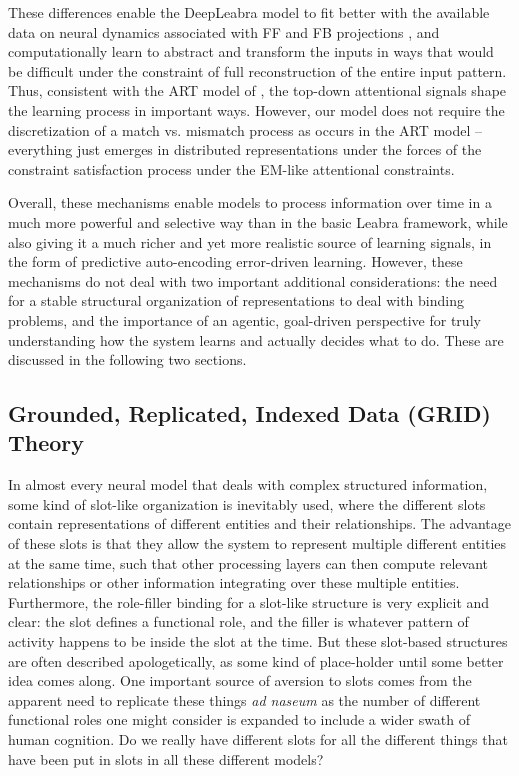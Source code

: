 \documentclass[11pt,twoside]{article}
\newif\myifpdf
\begin{document}
\begin{itemize}
These differences enable the DeepLeabra model to fit better with the available data on neural dynamics associated with FF and FB projections \cite{MarkovVezoliChameauEtAl14}, and computationally learn to abstract and transform the inputs in ways that would be difficult under the constraint of full reconstruction of the entire input pattern.  Thus, consistent with the ART model of , the top-down attentional signals shape the learning process in important ways.  However, our model does not require the discretization of a match vs. mismatch process as occurs in the ART model -- everything just emerges in distributed representations under the forces of the constraint satisfaction process under the EM-like attentional constraints.

\end{itemize}

Overall, these mechanisms enable models to process information over time in a much more powerful and selective way than in the basic Leabra framework, while also giving it a much richer and yet more realistic source of learning signals, in the form of predictive auto-encoding error-driven learning.  However, these mechanisms do not deal with two important additional considerations: the need for a stable structural organization of representations to deal with binding problems, and the importance of an agentic, goal-driven perspective for truly understanding how the system learns and actually decides what to do.  These are discussed in the following two sections.

\subsection{Grounded, Replicated, Indexed Data (GRID) Theory}

In almost every neural model that deals with complex structured information, some kind of slot-like organization is inevitably used, where the different slots contain representations of different entities and their relationships.  The advantage of these slots is that they allow the system to represent multiple different entities at the same time, such that other processing layers can then compute relevant relationships or other information integrating over these multiple entities.  Furthermore, the role-filler binding for a slot-like structure is very explicit and clear: the slot defines a functional role, and the filler is whatever pattern of activity happens to be inside the slot at the time.  But these slot-based structures are often described apologetically, as some kind of place-holder until some better idea comes along.  One important source of aversion to slots comes from the apparent need to replicate these things {\em ad naseum} as the number of different functional roles one might consider is expanded to include a wider swath of human cognition.  Do we really have different slots for all the different things that have been put in slots in all these different models?
\end{document}
